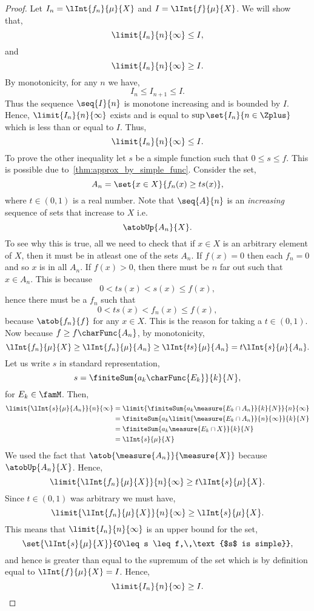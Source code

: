 \begin{proof}
    Let $I_n = \lInt{f_n}{\mu}{X}$ and $I = \lInt{f}{\mu}{X}$. We will show that,
    \[\limit{I_n}{n}{\infty} \leq I,\]
    and
    \[\limit{I_n}{n}{\infty} \geq I.\]
    By monotonicity, for any $n$ we have,
    \[I_n \leq I_{n+1} \leq I.\]
    Thus the sequence $\seq{I}{n}$ is monotone increasing and is bounded by $I$. Hence,
    $\limit{I_n}{n}{\infty}$ exists and is equal to $\sup\set{I_n}{n\in\Zplus}$ which is less than or equal to
    $I$. Thus,
    \[\limit{I_n}{n}{\infty}\leq I.\]
    To prove the other inequality let $s$ be a simple function such that $0\leq s \leq f$. This is possible
    due to~\ref{thm:approx_by_simple_func}. Consider the set,
    \[A_n = \set{x\in X}{f_n(x) \geq ts(x)},\]
    where $t \in (0,1)$ is a real number.
    Note that $\seq{A}{n}$ is an \emph{increasing} sequence of sets that increase to $X$
    i.e.~\[\atobUp{A_n}{X}.\]
    To see why this is true, all we need to check that if $x \in X$ is an arbitrary element of $X$, then it
    must be in atleast one of the sets $A_n$. If $f(x) = 0$ then each $f_n = 0 $ and so $x$ is in all $A_n$.
    If $f(x) > 0$, then there must be $n$ far out such that $x \in A_n$. This is because
    \[0 < ts(x) < s(x) \leq f(x),\]
    hence there must be a $f_n$ such that 
    \[0 < ts(x) < f_n(x) \leq f(x), \]
    because $\atob{f_n}{f}$ for any $x \in X$. This is the reason for taking a $t \in (0,1)$.
    Now because $f \geq f\charFunc{A_n}$, by monotonicity, 
    \[\lInt{f_n}{\mu}{X} \geq \lInt{f_n}{\mu}{A_n} \geq \lInt{ts}{\mu}{A_n} = t\lInt{s}{\mu}{A_n}.\]
    Let us write $s$ in standard representation,
    \[s = \finiteSum{a_k\charFunc{E_k}}{k}{N},\]
    for $E_k \in \famM$.
    Then,
    \begin{align*}
	\limit{\lInt{s}{\mu}{A_n}}{n}{\infty} &= \limit{\finiteSum{a_k\measure{E_k\cap
		    A_n}}{k}{N}}{n}{\infty}\\
	& = \finiteSum{a_k\limit{\measure{E_k\cap A_n}}{n}{\infty}}{k}{N}\\
	& = \finiteSum{a_k\measure{E_k\cap X}}{k}{N}\\
	& = \lInt{s}{\mu}{X}
    \end{align*}
    We used the fact that $\atob{\measure{A_n}}{\measure{X}}$ because $\atobUp{A_n}{X}$.
    Hence,
    \[\limit{\lInt{f_n}{\mu}{X}}{n}{\infty} \geq t\lInt{s}{\mu}{X}.\]
    Since $t\in (0,1)$ was arbitrary we must have,
    \[\limit{\lInt{f_n}{\mu}{X}}{n}{\infty} \geq \lInt{s}{\mu}{X}.\]
    This means that $\limit{I_n}{n}{\infty}$ is an upper bound for the set,
    \[\set{\lInt{s}{\mu}{X}}{0\leq s \leq f,\,\text{$s$ is simple}},\]
    and hence is greater than equal to the supremum of the set which is by definition equal to 
    $\lInt{f}{\mu}{X} = I$. Hence,
    \[\limit{I_n}{n}{\infty}\geq I.\]

\end{proof}

